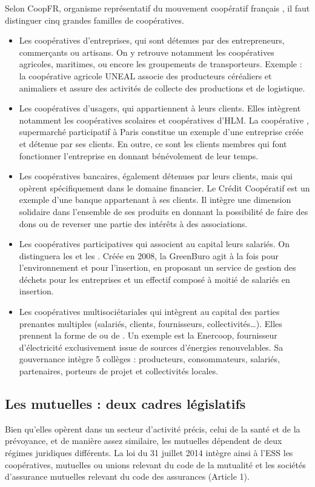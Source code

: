         Selon CoopFR, organisme représentatif du mouvement coopératif français , il faut distinguer cinq grandes familles de coopératives.
        \begin{itemize}
            \item Les coopératives d’entreprises, qui sont détenues par des entrepreneurs, commerçants ou artisans. On y retrouve notamment les coopératives agricoles, maritimes, ou encore les groupements de transporteurs. Exemple : la coopérative agricole UNEAL associe des producteurs céréaliers et animaliers et assure des activités de collecte des productions et de logistique.
            \item Les coopératives d’usagers, qui appartiennent à leurs clients. Elles intègrent notamment les coopératives scolaires et coopératives d’HLM. La coopérative , supermarché participatif à Paris constitue un exemple d’une entreprise créée et détenue par ses clients. En outre, ce sont les clients membres qui font fonctionner l’entreprise en donnant bénévolement de leur temps.
            \item Les coopératives bancaires, également détenues par leurs clients, mais qui opèrent spécifiquement dans le domaine financier. Le Crédit Coopératif est un exemple d’une banque appartenant à ses clients. Il intègre une dimension solidaire dans l’ensemble de ses produits en donnant la possibilité de faire des dons ou de reverser une partie des intérêts à des associations.
            \item Les coopératives participatives qui associent au capital leurs salariés. On distinguera les \scop et les \cae. Créée en 2008, la \scop GreenBuro agit à la fois pour l’environnement et pour l’insertion, en proposant un service de gestion des déchets pour les entreprises et un effectif composé à moitié de salariés en insertion.
            \item Les coopératives multisociétariales qui intègrent au capital des parties prenantes multiples (salariés, clients, fournisseurs, collectivités…). Elles prennent la forme de \scic ou de \sce. Un exemple est la \scic Enercoop, fournisseur d’électricité exclusivement issue de sources d’énergies renouvelables. Sa gouvernance intègre 5 collèges : producteurs, consommateurs, salariés, partenaires, porteurs de projet et collectivités locales.

        \end{itemize}

    \subsection{Les mutuelles : deux cadres législatifs}
        Bien qu’elles opèrent dans un secteur d’activité précis, celui de la santé et de la prévoyance, et de manière assez similaire, les mutuelles dépendent de deux régimes juridiques différents. La loi du 31 juillet 2014 intègre ainsi à l’ESS les coopératives, mutuelles ou unions relevant du code de la mutualité et les sociétés d'assurance mutuelles relevant du code des assurances (Article 1).

